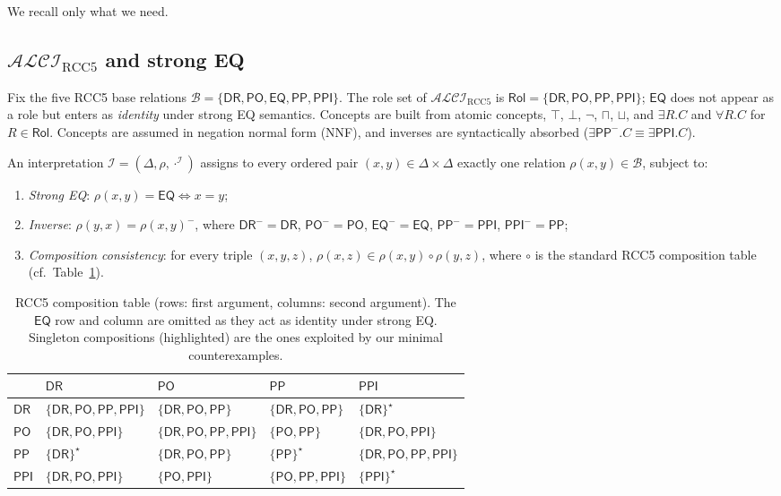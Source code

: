 \documentclass[]{ceurart}
\newcommand{\ALCI}{\mathcal{ALCI}}
\newcommand{\ALCIRCC}[1]{\ALCI_{\mathrm{RCC}#1}}
\newcommand{\DR}{\mathsf{DR}}
\newcommand{\PO}{\mathsf{PO}}
\newcommand{\PP}{\mathsf{PP}}
\newcommand{\PPI}{\mathsf{PPI}}
\newcommand{\EQ}{\mathsf{EQ}}
\newcommand{\comp}{\circ}
\newcommand{\inv}[1]{#1^{-}}
\theoremstyle{definition}
\theoremstyle{remark}
\begin{document}
We recall only what we need.

\subsection{$\ALCIRCC{5}$ and strong EQ}

Fix the five RCC5 base relations
$\mathcal{B} = \{\DR, \PO, \EQ, \PP, \PPI\}$. The role set of
$\ALCIRCC{5}$ is
$\mathsf{Rol} = \{\DR, \PO, \PP, \PPI\}$; $\EQ$ does not appear as
a role but enters as \emph{identity} under strong EQ semantics.
Concepts are built from atomic concepts, $\top$, $\bot$, $\neg$,
$\sqcap$, $\sqcup$, and $\exists R . C$ and $\forall R . C$ for
$R \in \mathsf{Rol}$. Concepts are assumed in negation normal form
(NNF), and inverses are syntactically absorbed
($\exists \PP^{-} . C \equiv \exists \PPI . C$).

An interpretation
$\mathcal{I} = (\Delta, \rho, {\cdot}^{\mathcal{I}})$ assigns to every
ordered pair $(x, y) \in \Delta \times \Delta$ exactly one relation
$\rho(x, y) \in \mathcal{B}$, subject to:
\begin{enumerate}
  \item \emph{Strong EQ}: $\rho(x, y) = \EQ \iff x = y$;
  \item \emph{Inverse}: $\rho(y, x) = \inv{\rho(x, y)}$, where
    $\inv{\DR} = \DR$, $\inv{\PO} = \PO$, $\inv{\EQ} = \EQ$,
    $\inv{\PP} = \PPI$, $\inv{\PPI} = \PP$;
  \item \emph{Composition consistency}: for every triple $(x, y, z)$,
    $\rho(x, z) \in \rho(x, y) \comp \rho(y, z)$, where $\comp$ is the
    standard RCC5 composition table (cf.~Table~\ref{tab:comp}).
\end{enumerate}

\begin{table}
  \caption{RCC5 composition table (rows: first argument, columns:
    second argument). The $\EQ$ row and column are omitted as they
    act as identity under strong EQ.  Singleton compositions
    (highlighted) are the ones exploited by our minimal
    counterexamples.}
  \label{tab:comp}
  \centering
  \begin{tabular}{l|llll}
    \toprule
           & $\DR$                  & $\PO$                    & $\PP$                  & $\PPI$                 \\
    \midrule
    $\DR$  & $\{\DR,\PO,\PP,\PPI\}$ & $\{\DR,\PO,\PP\}$        & $\{\DR,\PO,\PP\}$      & $\{\DR\}^{\star}$      \\
    $\PO$  & $\{\DR,\PO,\PPI\}$     & $\{\DR,\PO,\PP,\PPI\}$   & $\{\PO,\PP\}$          & $\{\DR,\PO,\PPI\}$     \\
    $\PP$  & $\{\DR\}^{\star}$      & $\{\DR,\PO,\PP\}$        & $\{\PP\}^{\star}$      & $\{\DR,\PO,\PP,\PPI\}$ \\
    $\PPI$ & $\{\DR,\PO,\PPI\}$     & $\{\PO,\PPI\}$           & $\{\PO,\PP,\PPI\}$     & $\{\PPI\}^{\star}$     \\
    \bottomrule
  \end{tabular}
\end{table}
\end{document}
